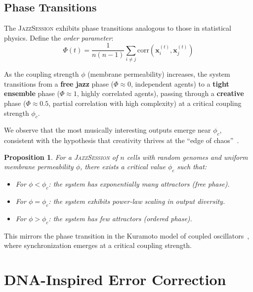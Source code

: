 \documentclass[11pt,a4paper]{article}
\newtheorem{proposition}[theorem]{Proposition}
\newcommand{\JazzSession}{\textsc{JazzSession}}
\begin{document}
\subsection{Phase Transitions}

The \JazzSession{} exhibits phase transitions analogous to those in statistical physics. Define the \emph{order parameter}:
\begin{equation}
  \Phi(t) = \frac{1}{n(n-1)} \sum_{i \neq j} \text{corr}(\mathbf{x}_i^{(t)}, \mathbf{x}_j^{(t)})
\end{equation}

As the coupling strength $\phi$ (membrane permeability) increases, the system transitions from a \textbf{free jazz} phase ($\Phi \approx 0$, independent agents) to a \textbf{tight ensemble} phase ($\Phi \approx 1$, highly correlated agents), passing through a \textbf{creative} phase ($\Phi \approx 0.5$, partial correlation with high complexity) at a critical coupling strength $\phi_c$.

We observe that the most musically interesting outputs emerge near $\phi_c$, consistent with the hypothesis that creativity thrives at the ``edge of chaos''~\citep{langton1990}.

\begin{proposition}\label{prop:critical}
For a \JazzSession{} of $n$ cells with random genomes and uniform membrane permeability $\phi$, there exists a critical value $\phi_c$ such that:
\begin{itemize}
  \item For $\phi < \phi_c$: the system has exponentially many attractors (free phase).
  \item For $\phi = \phi_c$: the system exhibits power-law scaling in output diversity.
  \item For $\phi > \phi_c$: the system has few attractors (ordered phase).
\end{itemize}
\end{proposition}

This mirrors the phase transition in the Kuramoto model of coupled oscillators~\citep{kuramoto1975}, where synchronization emerges at a critical coupling strength.

\section{DNA-Inspired Error Correction}\label{sec:dna}
\end{document}
